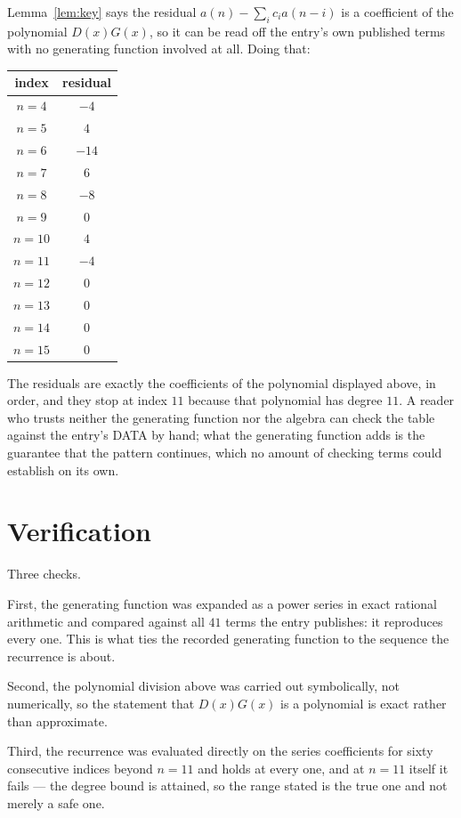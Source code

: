 \documentclass[11pt,a4paper]{article}
\theoremstyle{plain}
\theoremstyle{definition}
\begin{document}
Lemma~\ref{lem:key} says the residual $a(n)-\sum_ic_ia(n-i)$ is a coefficient of the
polynomial $D(x)G(x)$, so it can be read off the entry's own published terms with no
generating function involved at all. Doing that:
\begin{center}
\begin{tabular}{cc}
index & residual \\ \hline
$n=4$ & $-4$ \\
$n=5$ & $4$ \\
$n=6$ & $-14$ \\
$n=7$ & $6$ \\
$n=8$ & $-8$ \\
$n=9$ & $0$ \\
$n=10$ & $4$ \\
$n=11$ & $-4$ \\
$n=12$ & $0$ \\
$n=13$ & $0$ \\
$n=14$ & $0$ \\
$n=15$ & $0$
\end{tabular}
\end{center}
The residuals are exactly the coefficients of the polynomial displayed above, in order, and
they stop at index $11$ because that polynomial has degree $11$. A reader who trusts
neither the generating function nor the algebra can check the table against the entry's DATA
by hand; what the generating function adds is the guarantee that the pattern continues, which
no amount of checking terms could establish on its own.

\section{Verification}

Three checks.

First, the generating function was expanded as a power series in exact rational arithmetic and
compared against all $41$ terms the entry publishes: it reproduces every one. This is
what ties the recorded generating function to the sequence the recurrence is about.

Second, the polynomial division above was carried out symbolically, not numerically, so the
statement that $D(x)G(x)$ is a polynomial is exact rather than approximate.

Third, the recurrence was evaluated directly on the series coefficients for sixty consecutive
indices beyond $n=11$ and holds at every one, and at $n=11$ itself it fails --- the
degree bound is attained, so the range stated is the true one and not merely a safe one.
\end{document}
